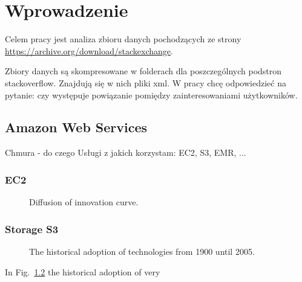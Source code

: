 \documentclass[a4paper,12pt,twoside]{report} %
\begin{document}
%
\tableofcontents

\chapter{Wprowadzenie}
Celem pracy jest analiza zbioru danych pochodzących ze strony \url{https://archive.org/download/stackexchange}. 

Zbiory danych są skompresowane w folderach dla poszczególnych podstron stackoverflow. Znajdują się w nich pliki xml.
W pracy chcę odpowiedzieć na pytanie: czy występuje powiązanie pomiędzy zainteresowaniami użytkowników. 


\indent
\section{Amazon Web Services}
Chmura - do czego
Usługi z jakich korzystam: EC2, S3, EMR, ...

\subsection{EC2}


\begin{figure}[H]
\centering
\caption[foot]{Diffusion of innovation curve. \footnotemark[1]}
\label{fig:diffusion_curve}
\end{figure}

\subsection{Storage S3}

\begin{figure}[H]
\centering
\caption[foot]{The historical adoption of technologies from 1900 until 2005. \footnotemark[2]}
\label{fig:diffusion_technologies}
\end{figure}

In Fig.~\ref{fig:diffusion_technologies} the historical adoption of very 

\end{document}
